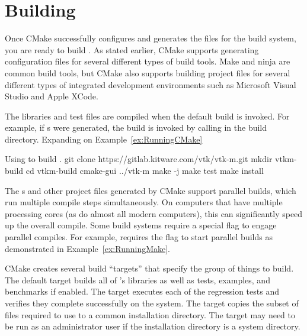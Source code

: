 

\section{Building \VTKm}

Once CMake successfully configures \VTKm and generates the files for the build system, you are ready to build \VTKm.
As stated earlier, CMake supports generating configuration files for several different types of build tools.
Make and ninja are common build tools, but CMake also supports building project files for several different types of integrated development environments such as Microsoft Visual Studio and Apple XCode.

The \VTKm libraries and test files are compiled when the default build is invoked.
For example, if s were generated, the build is invoked by calling  in the build directory.
Expanding on Example~\ref{ex:RunningCMake}

\begin{blankexample}[ex:RunningMake]{Using  to build \VTKm.}
git clone https://gitlab.kitware.com/vtk/vtk-m.git
mkdir vtkm-build
cd vtkm-build
cmake-gui ../vtk-m
make -j
make test
make install
\end{blankexample}

\begin{didyouknow}
  The s and other project files generated by CMake support parallel builds, which run multiple compile steps simultaneously.
  On computers that have multiple processing cores (as do almost all modern computers), this can significantly speed up the overall compile.
  Some build systems require a special flag to engage parallel compiles.
  For example,  requires the  flag to start parallel builds as demonstrated in Example~\ref{ex:RunningMake}.
\end{didyouknow}

CMake creates several build ``targets'' that specify the group of things to build.
The default target builds all of \VTKm's libraries as well as tests, examples, and benchmarks if enabled.
The  target executes each of the \VTKm regression tests and verifies they complete successfully on the system.
The  target copies the subset of files required to use \VTKm to a common installation directory.
The  target may need to be run as an administrator user if the installation directory is a system directory.

